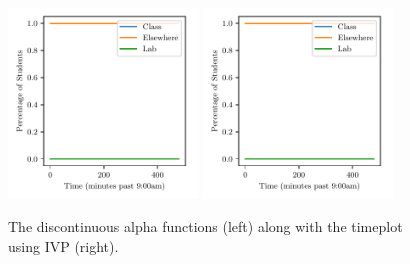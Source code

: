 \documentclass[11pt]{amsart}
\begin{document}
\begin{figure}[htp]
    \centering
    \includegraphics[width=0.45\textwidth]{temp.pdf}\hfill
    \includegraphics[width=0.45\textwidth]{temp.pdf}\hfill

    \caption{The discontinuous alpha functions (left) along with the timeplot using IVP (right).}
    \label{fig:discontinuous_alpha}

\end{figure}
\end{document}
